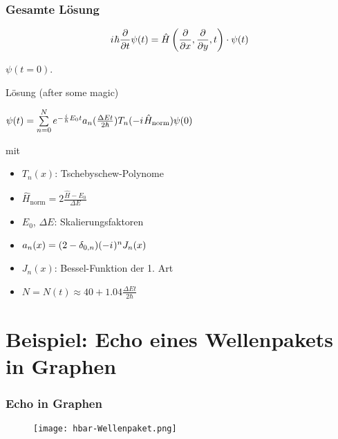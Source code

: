 \documentclass{beamer}
\newcommand{\iu}{{i\mkern1mu}} 	%
\begin{document}
\begin{frame}[t] %
  \frametitle{Gesamte Lösung}
  \vskip-5mm
    \begin{equation*}
      \iu \hbar \frac{\partial}{\partial t}  \psi(t) = \hat{H}\left(\frac{\partial}{\partial x}, \frac{\partial}{\partial y}, t\right) \cdot \psi(t) 
    \end{equation*}
  
      $\psi(t=0)$.
    \begin{block}{Lösung (after some magic)}
  \begin{center}$\psi(t) = \sum\limits_{n=0}^N e^{-\frac{\iu}{\hbar}E_0 t} a_n(\frac{\Delta E t}{2\hbar}) T_n(-\iu\hat{H}_\text{norm})\psi(0)$\end{center}
    \end{block}     
  mit

    \begin{itemize}
  \item $T_n(x)$: Tschebyschew-Polynome
  \item $\hat{H}_\text{norm} = 2 \frac{\hat{H}-E_0}{\Delta E}$
  \item $E_0$, $\Delta E$: Skalierungsfaktoren 
  \item $a_n(x) = (2-\delta_{0,n})(-\iu)^n J_n(x)$
  \item $J_n(x)$: Bessel-Funktion der 1. Art
  \item $N= N(t) \approx 40 + 1.04 \frac{\Delta E t}{2\hbar}$
    \end{itemize}
\end{frame}

\section{Beispiel: Echo eines Wellenpakets in Graphen}
\begin{frame}[t]%
  \vskip-3mm
  \frametitle{Echo in Graphen}
     \begin{figure}\centering
      \texttt{[image: hbar-Wellenpaket.png]}
     \end{figure} 
 \end{frame}
\end{document}
